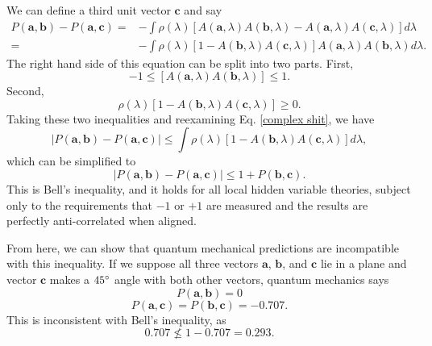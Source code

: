 \documentclass[11pt,letterpaper]{article}
\begin{document}
We can define a third unit vector $\textbf{c}$ and say
\begin{align}
    P(\textbf{a}, \textbf{b}) - P(\textbf{a}, \textbf{c}) = & -\int \rho (\lambda) [A(\textbf{a}, \lambda) A(\textbf{b}, \lambda) - A(\textbf{a}, \lambda) A(\textbf{c}, \lambda)] d\lambda \\
    = & -\int \rho (\lambda) [1 - A(\textbf{b}, \lambda) A(\textbf{c}, \lambda)] A(\textbf{a}, \lambda) A(\textbf{b}, \lambda) d\lambda . \label{complex shit}
\end{align}
The right hand side of this equation can be split into two parts. First,
\begin{equation}
    -1 \le [A(\textbf{a}, \lambda) A(\textbf{b}, \lambda)] \le 1 .
\end{equation}
Second,
\begin{equation}
    \rho(\lambda) [1 - A(\textbf{b}, \lambda) A(\textbf{c}, \lambda)] \ge 0 .
\end{equation}
Taking these two inequalities and reexamining Eq. \ref{complex shit}, we have
\begin{equation}
    |P(\textbf{a}, \textbf{b}) - P(\textbf{a}, \textbf{c})| \le \int \rho(\lambda) [1 - A(\textbf{b}, \lambda) A(\textbf{c}, \lambda)] d\lambda ,
\end{equation}
which can be simplified to
\begin{equation}
    |P(\textbf{a}, \textbf{b}) - P(\textbf{a}, \textbf{c})| \le 1 + P(\textbf{b}, \textbf{c}) .
\end{equation}
This is Bell's inequality, and it holds for all local hidden variable theories, subject only to the requirements that $-1$ or $+1$ are measured and the results are perfectly anti-correlated when aligned.

From here, we can show that quantum mechanical predictions are incompatible with this inequality. If we suppose all three vectors $\textbf{a}$, $\textbf{b}$, and $\textbf{c}$ lie in a plane and vector $\textbf{c}$ makes a $45\degree$ angle with both other vectors, quantum mechanics says
\begin{equation}
    P(\textbf{a}, \textbf{b}) = 0
\end{equation}
\begin{equation}
    P(\textbf{a}, \textbf{c}) = P(\textbf{b}, \textbf{c}) = -0.707 .
\end{equation}
This is inconsistent with Bell's inequality, as
\begin{equation}
    0.707 \nleq 1 - 0.707 = 0.293 .
\end{equation}
\end{document}
